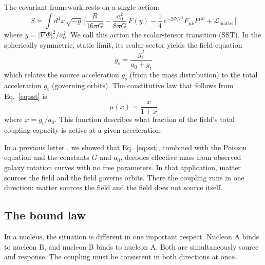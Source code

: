 \documentclass[fleqn,usenatbib]{mnras}
\begin{document}
The covariant framework rests on a single action:
\begin{equation}
S = \int d^4 x\,\sqrt{-g}\,\bigg[ \frac{R}{16\pi G} - \frac{a_0^2}{8\pi G}\,F(y) - \frac{1}{4}\,e^{-2\Phi/c^2}F_{\mu\nu}F^{\mu\nu} + \mathcal{L}_{\mathrm{matter}} \bigg]
\label{eq:action}
\end{equation}
where $y = |\nabla\Phi|^2/a_0^2$. We call this action the scalar-tensor transition (SST). In the spherically symmetric, static limit, its scalar sector yields the field equation
\begin{equation}
g_{\mathrm{s}} = \frac{g_{\mathrm{t}}^2}{a_0 + g_{\mathrm{t}}}
\label{eq:sst}
\end{equation}
which relates the source acceleration $g_{\mathrm{s}}$ (from the mass distribution) to the total acceleration $g_{\mathrm{t}}$ (governing orbits). The constitutive law that follows from Eq.~\ref{eq:sst} is
\begin{equation}
\mu(x) = \frac{x}{1+x}
\label{eq:mu}
\end{equation}
where $x = g_{\mathrm{t}}/a_0$. This function describes what fraction of the field's total coupling capacity is active at a given acceleration.

In a previous letter \citep{Nelson2026}, we showed that Eq.~\ref{eq:sst}, combined with the Poisson equation and the constants $G$ and $a_0$, decodes effective mass from observed galaxy rotation curves with no free parameters. In that application, matter sources the field and the field governs orbits. There the coupling runs in one direction: matter sources the field and the field does not source itself.

\subsection{The bound law}
\label{sec:quadratic}

In a nucleus, the situation is different in one important respect. Nucleon A binds to nucleon B, and nucleon B binds to nucleon A. Both are simultaneously source and response. The coupling must be consistent in both directions at once.
\end{document}
